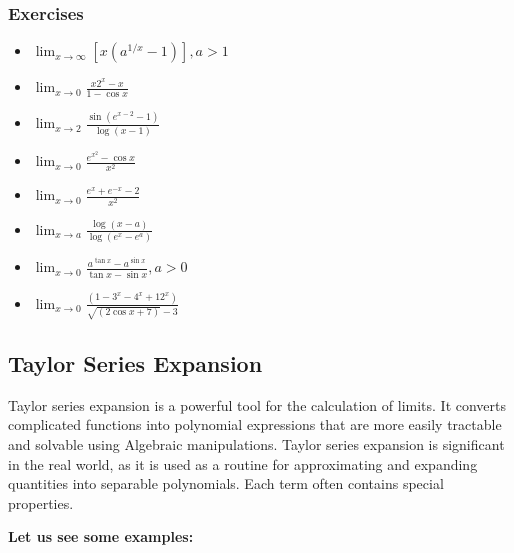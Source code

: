 \subsubsection{Exercises}

\begin{itemize}
    \item  $\lim _{x \rightarrow \infty}\left[x\left(a^{1 / x}-1\right)\right], a>1$
    \item  $\lim _{x \rightarrow 0} \frac{x 2^x-x}{1-\cos x}$
\item   $\lim _{x \rightarrow 2} \frac{\sin \left(e^{x-2}-1\right)}{\log (x-1)}$
\item   $\lim _{x \rightarrow 0} \frac{e^{x^2}-\cos x}{x^2}$
\item   $\lim _{x \rightarrow 0} \frac{e^x+e^{-x}-2}{x^2}$
\item   $\lim _{x \rightarrow a} \frac{\log (x-a)}{\log \left(e^x-e^a\right)}$
\item   $\lim _{x \rightarrow 0} \frac{a^{\tan x}-a^{\sin x}}{\tan x-\sin x}, a>0$
\item   $\lim _{x \rightarrow 0} \frac{\left(1-3^x-4^x+12^x\right)}{\sqrt{(2 \cos x+7)}-3}$
\end{itemize}


\subsection{Taylor Series Expansion}

Taylor series expansion is a powerful tool for the calculation of limits. It converts complicated functions into polynomial expressions that are more easily tractable and solvable using Algebraic manipulations. Taylor series expansion is significant in the real world, as it is used as a routine for approximating and expanding quantities into separable polynomials. Each term often contains special properties.


\textbf{Let us see some examples:}


